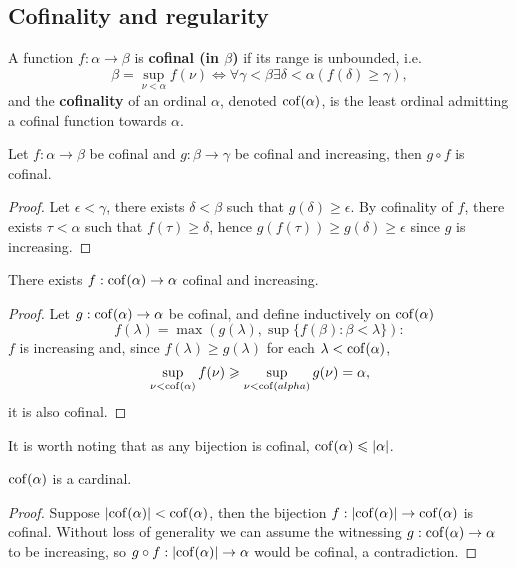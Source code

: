 \documentclass[twoside,openright,titlepage,numbers=noenddot,%
               headinclude,footinclude,cleardoublepage=empty,abstract=on,
               BCOR=23mm,paper=letter,fontsize=11pt
               ]{scrreprt}
\begin{document}
\subsection{Cofinality and regularity}
\begin{definition}
    A function $f: \alpha \to \beta$ is \textbf{cofinal (in $\beta$)} if its range is unbounded, i.e.
    \[ \beta = \sup_{\nu < \alpha} f(\nu) \iff \forall \gamma < \beta \exists \delta < \alpha (f(\delta) \geq \gamma), \]
    and the \textbf{cofinality} of an ordinal $\alpha$, denoted $\mathrm{cof}(\alpha)$, is the least ordinal admitting a cofinal function towards $\alpha$.
\end{definition}
\begin{proposition}
    Let $f: \alpha \to \beta$ be cofinal and $g: \beta \to \gamma$ be cofinal and increasing, then $g \circ f$ is cofinal.
\end{proposition}
\begin{proof}
    Let $\epsilon < \gamma$, there exists $\delta < \beta$ such that $g(\delta) \geq \epsilon$. By cofinality of $f$, there exists $\tau < \alpha$ such that $f(\tau) \geq \delta$, hence $g(f(\tau)) \geq g(\delta) \geq \epsilon$ since $g$ is increasing.
\end{proof}
\begin{proposition}
    There exists $f: \mathrm{cof}(\alpha) \to \alpha$ cofinal and increasing.
\end{proposition}
\begin{proof}
    Let $g: \mathrm{cof}(\alpha) \to \alpha$ be cofinal, and define inductively on $\mathrm{cof}(\alpha)$
    \[ f(\lambda) = \max(g(\lambda), \sup\{f(\beta): \beta < \lambda\}):\]
    $f$ is increasing and, since $f(\lambda) \geq g(\lambda)$ for each $\lambda < \mathrm{cof}(\alpha)$,
    \[ \sup_{\nu < \mathrm{cof}(\alpha)} f(\nu) \geqslant \sup_{\nu < \mathrm{cof}(alpha)} g(\nu) = \alpha, \]
    it is also cofinal.
\end{proof}
It is worth noting that as any bijection is cofinal, $\mathrm{cof}(\alpha) \leqslant \vert \alpha \vert$.
\begin{corollary}
    $\mathrm{cof}(\alpha)$ is a cardinal.
\end{corollary}
\begin{proof}
    Suppose $\vert \mathrm{cof}(\alpha) \vert < \mathrm{cof}(\alpha)$, then the bijection $f: \vert \mathrm{cof}(\alpha) \vert \to \mathrm{cof}(\alpha)$ is cofinal. Without loss of generality we can assume the witnessing $g: \mathrm{cof}(\alpha) \to \alpha$ to be increasing, so $g \circ f: \vert \mathrm{cof}(\alpha) \vert \to \alpha$ would be cofinal, a contradiction.
\end{proof}
\end{document}
